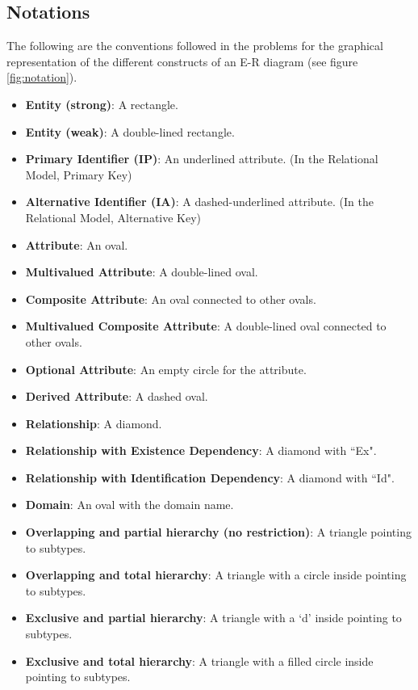 \documentclass{article}
\numberwithin{figure}{section}
\begin{document}
\subsection{Notations}

The following are the conventions followed in the problems for the graphical representation of the different constructs of an E-R diagram (see figure \ref{fig:notation}).

\begin{itemize}
    \item \textbf{Entity (strong)}: A rectangle.
    \item \textbf{Entity (weak)}: A double-lined rectangle.
    \item \textbf{Primary Identifier (IP)}: An underlined attribute. (In the Relational Model, Primary Key)
    \item \textbf{Alternative Identifier (IA)}: A dashed-underlined attribute. (In the Relational Model, Alternative Key)
    \item \textbf{Attribute}: An oval.
    \item \textbf{Multivalued Attribute}: A double-lined oval.
    \item \textbf{Composite Attribute}: An oval connected to other ovals.
    \item \textbf{Multivalued Composite Attribute}: A double-lined oval connected to other ovals.
    \item \textbf{Optional Attribute}: An empty circle for the attribute.
    \item \textbf{Derived Attribute}: A dashed oval.
    \item \textbf{Relationship}: A diamond.
    \item \textbf{Relationship with Existence Dependency}: A diamond with ``Ex".
    \item \textbf{Relationship with Identification Dependency}: A diamond with ``Id".
    \item \textbf{Domain}: An oval with the domain name.
    \item \textbf{Overlapping and partial hierarchy (no restriction)}: A triangle pointing to subtypes.
    \item \textbf{Overlapping and total hierarchy}: A triangle with a circle inside pointing to subtypes.
    \item \textbf{Exclusive and partial hierarchy}: A triangle with a `d' inside pointing to subtypes.
    \item \textbf{Exclusive and total hierarchy}: A triangle with a filled circle inside pointing to subtypes.
\end{itemize}
\end{document}

